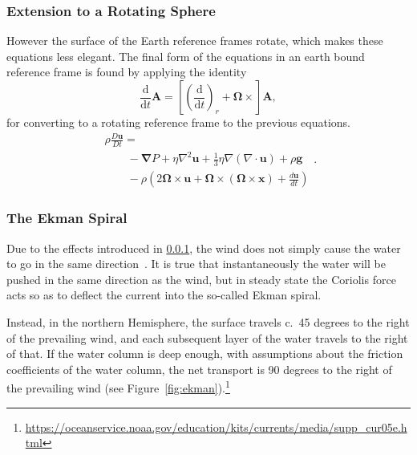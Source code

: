 \subsubsection{Extension to a Rotating Sphere}
\label{app:rotating_equations}
However the surface of the Earth reference frames rotate,
 which makes these equations less elegant.
  The final form of the equations in an earth bound reference frame
  is found by applying the identity
\begin{equation}
\frac{\mathrm{d}}{\mathrm{d} t} \boldsymbol{A}=
\left[\left(\frac{\mathrm{d}}{\mathrm{d} t}\right)_{r}
+\mathbf{\Omega} \times\right] \boldsymbol{A},
\end{equation}
for converting to a rotating reference frame to the previous equations.
\begin{equation}
\begin{array}{l}
\rho \frac{D \mathbf{u}}{D t}=\\\quad\quad-\boldsymbol{\nabla} P+
\eta \nabla^{2} \mathbf{u}+\frac{1}{3} \eta \nabla(\nabla \cdot \mathbf{u})
+\rho \mathbf{g}\\\quad\quad-\rho\left(2 \mathbf{\Omega} \times \mathbf{u}
+\mathbf{\Omega} \times(\mathbf{\Omega} \times \mathbf{x})
+\frac{d \mathbf{u}}{d t}\right)\end{array}.
\tag{R-Momentum}
\end{equation}

\subsubsection{The Ekman Spiral}

Due to the effects introduced in \cref{app:rotating_equations},
the wind does not simply cause the water to go in
the same direction~\cite{ekman1905influence}.
It is true that instantaneously the water will be pushed in the same
direction as the wind, but in steady state the Coriolis force acts
so as to deflect the current into the so-called Ekman spiral.

Instead, in the northern Hemisphere,
 the surface travels c.~45 degrees to the
right of the prevailing wind, and each subsequent
layer of the water travels to the right of that.
If the water column is deep enough, with
assumptions about the friction coefficients of the water column,
the net transport is 90 degrees to the right of the prevailing wind
(see Figure~\ref{fig:ekman}).\footnote{\url{https://oceanservice.noaa.gov/education/kits/currents/media/supp_cur05e.html}}

